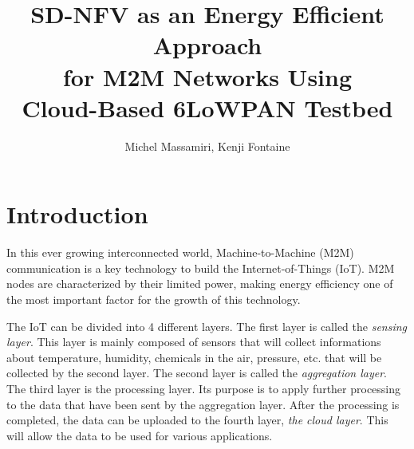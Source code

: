 \documentclass[10pt,journal,compsoc]{IEEEtran}
\begin{document}
%
\title{SD-NFV as an Energy Efficient Approach \\
       for M2M Networks Using \\
       Cloud-Based 6LoWPAN Testbed}

\author{Michel Massamiri,
        Kenji Fontaine}%



\maketitle


\IEEEdisplaynontitleabstractindextext
\IEEEpeerreviewmaketitle



\section{Introduction}\label{sec:introduction}

In this ever growing interconnected world, Machine-to-Machine (M2M) 
communication is a key technology to build the Internet-of-Things (IoT). 
M2M nodes are characterized by their limited power, making energy 
efficiency one of the most important factor for the growth of this 
technology. 

The IoT can be divided into 4 different layers. The first layer is called 
the \textit{sensing layer}. This layer is mainly composed of 
sensors that will collect informations about temperature, humidity, 
chemicals in the air, pressure, etc. that will be 
collected by the second layer. The second layer is called the 
\textit{aggregation layer}. The third layer is the processing layer. Its 
purpose is to apply further processing to the data that have been sent by 
the aggregation layer. After the processing is completed, the data can 
be uploaded to the fourth layer, \textit{the cloud layer}. This will 
allow the data to be used for various applications.
\end{document}
